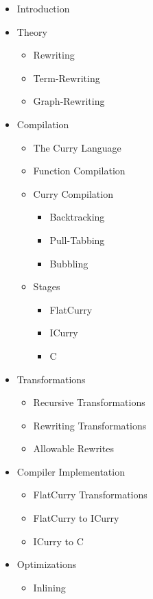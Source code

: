\documentclass{article}
\begin{document}
\begin{itemize}
    \item Introduction
    \item Theory
    \begin{itemize}
        \item Rewriting
        \item Term-Rewriting
        \item Graph-Rewriting
    \end{itemize}
    \item Compilation
    \begin{itemize}
        \item The Curry Language
        \item Function Compilation
        \item Curry Compilation
        \begin{itemize}
            \item Backtracking
            \item Pull-Tabbing
            \item Bubbling
        \end{itemize}
        \item Stages
        \begin{itemize}
            \item FlatCurry
            \item ICurry
            \item C
        \end{itemize}
    \end{itemize}
    \item Transformations
    \begin{itemize}
        \item Recursive Transformations
        \item Rewriting Transformations
        \item Allowable Rewrites
    \end{itemize}
    \item Compiler Implementation
    \begin{itemize}
        \item FlatCurry Transformations
        \item FlatCurry to ICurry
        \item ICurry to C
    \end{itemize}
    \item Optimizations
    \begin{itemize}
        \item Inlining

\end{itemize}
\end{itemize}
\end{document}
